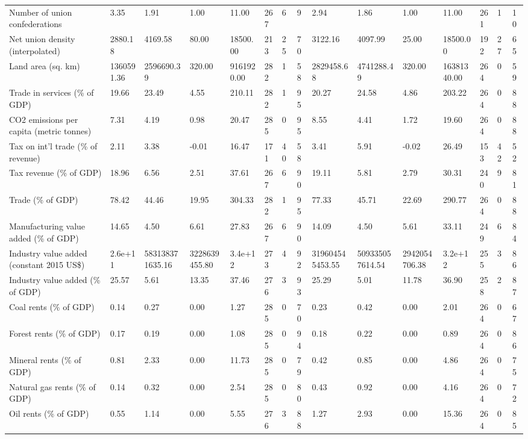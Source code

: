 \begin{longtable}{lllllllllllllll}
Number of union confederations & 3.35 & 1.91 & 1.00 & 11.00 & 267 & 6 & 9 & 2.94 & 1.86 & 1.00 & 11.00 & 261 & 1 & 10\\
Net union density (interpolated) & 2880.18 & 4169.58 & 80.00 & 18500.00 & 213 & 25 & 70 & 3122.16 & 4097.99 & 25.00 & 18500.00 & 192 & 27 & 65\\
Land area (sq. km) & 1360591.36 & 2596690.39 & 320.00 & 9161920.00 & 282 & 1 & 58 & 2829458.68 & 4741288.49 & 320.00 & 16381340.00 & 264 & 0 & 59\\
Trade in services (\% of GDP) & 19.66 & 23.49 & 4.55 & 210.11 & 282 & 1 & 95 & 20.27 & 24.58 & 4.86 & 203.22 & 264 & 0 & 88\\
\addlinespace
CO2 emissions per capita (metric tonnes) & 7.31 & 4.19 & 0.98 & 20.47 & 285 & 0 & 95 & 8.55 & 4.41 & 1.72 & 19.60 & 264 & 0 & 88\\
Tax on int'l trade (\% of revenue) & 2.11 & 3.38 & -0.01 & 16.47 & 171 & 40 & 58 & 3.41 & 5.91 & -0.02 & 26.49 & 153 & 42 & 52\\
Tax revenue (\% of GDP) & 18.96 & 6.56 & 2.51 & 37.61 & 267 & 6 & 90 & 19.11 & 5.81 & 2.79 & 30.31 & 240 & 9 & 81\\
Trade (\% of GDP) & 78.42 & 44.46 & 19.95 & 304.33 & 282 & 1 & 95 & 77.33 & 45.71 & 22.69 & 290.77 & 264 & 0 & 88\\
Manufacturing value added (\% of GDP) & 14.65 & 4.50 & 6.61 & 27.83 & 267 & 6 & 90 & 14.09 & 4.50 & 5.61 & 33.11 & 249 & 6 & 84\\
\addlinespace
Industry value added (constant 2015 US\$) & 2.6e+11 & 583138371635.16 & 3228639455.80 & 3.4e+12 & 273 & 4 & 92 & 319604545453.55 & 509335057614.54 & 2942054706.38 & 3.2e+12 & 255 & 3 & 86\\
Industry value added (\% of GDP) & 25.57 & 5.61 & 13.35 & 37.46 & 276 & 3 & 93 & 25.29 & 5.01 & 11.78 & 36.90 & 258 & 2 & 87\\
Coal rents (\% of GDP) & 0.14 & 0.27 & 0.00 & 1.27 & 285 & 0 & 70 & 0.23 & 0.42 & 0.00 & 2.01 & 264 & 0 & 67\\
Forest rents (\% of GDP) & 0.17 & 0.19 & 0.00 & 1.08 & 285 & 0 & 94 & 0.18 & 0.22 & 0.00 & 0.89 & 264 & 0 & 86\\
Mineral rents (\% of GDP) & 0.81 & 2.33 & 0.00 & 11.73 & 285 & 0 & 79 & 0.42 & 0.85 & 0.00 & 4.86 & 264 & 0 & 75\\
\addlinespace
Natural gas rents (\% of GDP) & 0.14 & 0.32 & 0.00 & 2.54 & 285 & 0 & 80 & 0.43 & 0.92 & 0.00 & 4.16 & 264 & 0 & 72\\
Oil rents (\% of GDP) & 0.55 & 1.14 & 0.00 & 5.55 & 276 & 3 & 88 & 1.27 & 2.93 & 0.00 & 15.36 & 264 & 0 & 85\\

\end{longtable}

